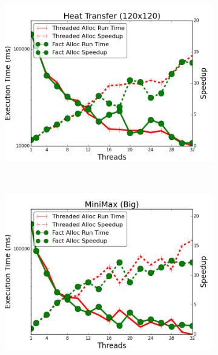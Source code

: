 \begin{figure}[h]
\begin{subfigure}[b]{\smallplotsize\textwidth}
                \label{fig:implementation:node_ggc}
        \end{subfigure}
        ~
        \begin{subfigure}[b]{\smallplotsize\textwidth}
                \includegraphics[width=\textwidth]{experiments/scalability/node-allocator-new-heat-transfer-120.png}
                \label{fig:implementation:node_ht}
        \end{subfigure}
        ~
        \begin{subfigure}[b]{\smallplotsize\textwidth}
                \includegraphics[width=\textwidth]{experiments/scalability/node-allocator-min-max-tictactoe-big.png}
                \label{fig:implementation:node_minimax}
        \end{subfigure}

\end{figure}
